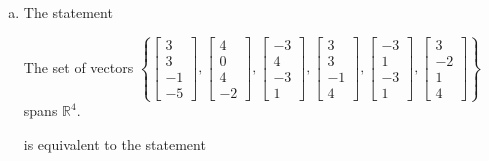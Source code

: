 \begin{exerciseAnswer}
\begin{enumerate}[(a)]
\item The statement 
\begin{center}\begin{minipage}{0.8\textwidth}
 The set of vectors \( \left\{ \left[\begin{array}{c}
3 \\
3 \\
-1 \\
-5
\end{array}\right] , \left[\begin{array}{c}
4 \\
0 \\
4 \\
-2
\end{array}\right] , \left[\begin{array}{c}
-3 \\
4 \\
-3 \\
1
\end{array}\right] , \left[\begin{array}{c}
3 \\
3 \\
-1 \\
4
\end{array}\right] , \left[\begin{array}{c}
-3 \\
1 \\
-3 \\
1
\end{array}\right] , \left[\begin{array}{c}
3 \\
-2 \\
1 \\
4
\end{array}\right] \right\} \) spans \(\mathbb{R}^4\). 
\end{minipage}\end{center}
     is equivalent to the statement 
\begin{center}\begin{minipage}{0.8\textwidth}
 The vector equation \( x_{1} \left[\begin{array}{c}
3 \\
3 \\
-1 \\
-5
\end{array}\right] + x_{2} \left[\begin{array}{c}
4 \\
0 \\

\end{array}
\end{minipage}
\end{center}
\end{enumerate}
\end{exerciseAnswer}
